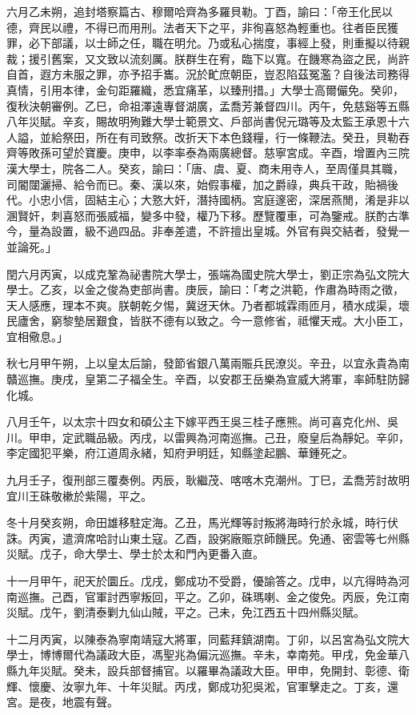\begin{pinyinscope}
六月乙未朔，追封塔察篇古、穆爾哈齊為多羅貝勒。丁酉，諭曰：「帝王化民以德，齊民以禮，不得已而用刑。法者天下之平，非徇喜怒為輕重也。往者臣民獲罪，必下部議，以士師之任，職在明允。乃或私心揣度，事經上發，則重擬以待親裁；援引舊案，又文致以流刻厲。朕群生在宥，臨下以寬。在饑寒為盜之民，尚許自首，遐方未服之罪，亦予招手巂。況於甿庶朝臣，豈忍陷茲冤濫？自後法司務得真情，引用本律，金句距羅織，悉宜痛革，以臻刑措。」大學士高爾儼免。癸卯，復秋決朝審例。乙巳，命祖澤遠專督湖廣，孟喬芳兼督四川。丙午，免慈谿等五縣八年災賦。辛亥，賜故明殉難大學士範景文、戶部尚書倪元璐等及太監王承恩十六人謚，並給祭田，所在有司致祭。改折天下本色錢糧，行一條鞭法。癸丑，貝勒吞齊等敗孫可望於寶慶。庚申，以李率泰為兩廣總督。慈寧宮成。辛酉，增置內三院漢大學士，院各二人。癸亥，諭曰：「唐、虞、夏、商未用寺人，至周僅具其職，司閽闥灑掃、給令而已。秦、漢以來，始假事權，加之爵祿，典兵干政，貽禍後代。小忠小信，固結主心；大憝大奸，潛持國柄。宮庭邃密，深居燕閒，淆是非以溷賢奸，刺喜怒而張威福，變多中發，權乃下移。歷覽覆車，可為鑒戒。朕酌古準今，量為設置，級不過四品。非奉差遣，不許擅出皇城。外官有與交結者，發覺一並論死。」

閏六月丙寅，以成克鞏為祕書院大學士，張端為國史院大學士，劉正宗為弘文院大學士。乙亥，以金之俊為吏部尚書。庚辰，諭曰：「考之洪範，作肅為時雨之徵，天人感應，理本不爽。朕朝乾夕惕，冀迓天休。乃者都城霖雨匝月，積水成渠，壞民廬舍，窮黎墊居艱食，皆朕不德有以致之。今一意修省，祗懼天戒。大小臣工，宜相儆息。」

秋七月甲午朔，上以皇太后諭，發節省銀八萬兩賑兵民潦災。辛丑，以宜永貴為南贛巡撫。庚戌，皇第二子福全生。辛酉，以安郡王岳樂為宣威大將軍，率師駐防歸化城。

八月壬午，以太宗十四女和碩公主下嫁平西王吳三桂子應熊。尚可喜克化州、吳川。甲申，定武職品級。丙戌，以雷興為河南巡撫。己丑，廢皇后為靜妃。辛卯，李定國犯平樂，府江道周永緒，知府尹明廷，知縣塗起鵬、華鍾死之。

九月壬子，復刑部三覆奏例。丙辰，耿繼茂、喀喀木克潮州。丁巳，孟喬芳討故明宜川王硃敬樕於紫陽，平之。

冬十月癸亥朔，命田雄移駐定海。乙丑，馬光輝等討叛將海時行於永城，時行伏誅。丙寅，遣濟席哈討山東土寇。乙酉，設粥廠賑京師饑民。免通、密雲等七州縣災賦。戊子，命大學士、學士於太和門內更番入直。

十一月甲午，祀天於圜丘。戊戌，鄭成功不受爵，優諭答之。戊申，以亢得時為河南巡撫。己酉，官軍討西寧叛回，平之。乙卯，硃瑪喇、金之俊免。丙辰，免江南災賦。戊午，劉清泰剿九仙山賊，平之。己未，免江西五十四州縣災賦。

十二月丙寅，以陳泰為寧南靖寇大將軍，同藍拜鎮湖南。丁卯，以呂宮為弘文院大學士，博博爾代為議政大臣，馮聖兆為偏沅巡撫。辛未，幸南苑。甲戌，免金華八縣九年災賦。癸未，設兵部督捕官。以羅畢為議政大臣。甲申，免開封、彰德、衛輝、懷慶、汝寧九年、十年災賦。丙戌，鄭成功犯吳淞，官軍擊走之。丁亥，還宮。是夜，地震有聲。


\end{pinyinscope}
